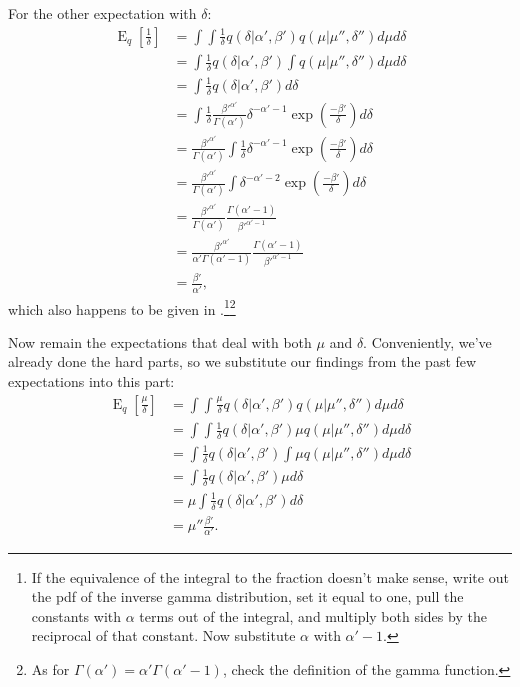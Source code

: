 \documentclass[12pt]{article}
\newcommand{\E}{\operatorname{E}}
\begin{document}
\begin{appendices}
For the other expectation with $\delta$:
\begin{align}
    \E_{q}[\frac{1}{\delta}] &= \int \int \frac{1}{\delta} q(\delta|\alpha', \beta')
    q(\mu|\mu'', \delta'') d\mu d\delta
    \nonumber \\
    &= \int \frac{1}{\delta} q(\delta|\alpha', \beta') \int
    q(\mu|\mu'', \delta'') d\mu d\delta
    \nonumber \\
    &= \int \frac{1}{\delta} q(\delta|\alpha', \beta') d\delta
    \nonumber \\
    &= \int \frac{1}{\delta} \frac{\beta'^{\alpha'}}{\Gamma(\alpha')}
    \delta^{-\alpha' - 1} \exp{\left(\frac{-\beta'}{\delta}\right)} d\delta
    \nonumber \\
    &= \frac{\beta'^{\alpha'}}{\Gamma(\alpha')} \int \frac{1}{\delta}
    \delta^{-\alpha' - 1} \exp{\left(\frac{-\beta'}{\delta}\right)} d\delta
    \nonumber \\
    &= \frac{\beta'^{\alpha'}}{\Gamma(\alpha')} \int
    \delta^{-\alpha' - 2} \exp{\left(\frac{-\beta'}{\delta}\right)} d\delta
    \nonumber \\
    &= \frac{\beta'^{\alpha'}}{\Gamma(\alpha')} \frac{\Gamma(\alpha' -
    1)}{\beta'^{\alpha'-1}}
    \nonumber \\
    &= \frac{\beta'^{\alpha'}}{\alpha'\Gamma(\alpha'-1)} \frac{\Gamma(\alpha' -
    1)}{\beta'^{\alpha'-1}}
    \nonumber \\
    &= \frac{\beta'}{\alpha'},
\end{align}
which also happens to be given in \autocite{invgamma}.\footnote{If the
equivalence of the integral to the fraction doesn't make sense, write out the
pdf of the inverse gamma distribution, set it equal to one, pull the constants
with $\alpha$ terms out of the integral, and multiply both sides by the
reciprocal of that constant.  Now substitute $\alpha$ with
$\alpha'-1$.}\footnote{As for $\Gamma(\alpha') = \alpha'\Gamma(\alpha'-1)$,
check the definition of the gamma function.}

Now remain the expectations that deal with both $\mu$ and $\delta$.
Conveniently, we've already done the hard parts, so we substitute our findings
from the past few expectations into this part:
\begin{align}
    \E_{q}[\frac{\mu}{\delta}] &= \int \int \frac{\mu}{\delta} q(\delta|\alpha', \beta')
    q(\mu|\mu'', \delta'') d\mu d\delta
    \nonumber \\
    &= \int \int \frac{1}{\delta} q(\delta|\alpha', \beta')
    \mu q(\mu|\mu'', \delta'') d\mu d\delta
    \nonumber \\
    &= \int \frac{1}{\delta} q(\delta|\alpha', \beta')
    \int \mu q(\mu|\mu'', \delta'') d\mu d\delta
    \nonumber \\
    &= \int \frac{1}{\delta} q(\delta|\alpha', \beta')
    \mu d\delta
    \nonumber \\
    &= \mu \int \frac{1}{\delta} q(\delta|\alpha', \beta')
    d\delta
    \nonumber \\
    &= \mu'' \frac{\beta'}{\alpha'}.
\end{align}


\end{appendices}
\end{document}
